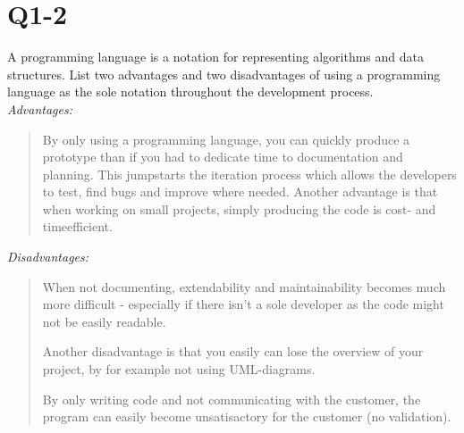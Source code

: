\section{Q1-2}
A programming language is a notation for representing algorithms and data structures. List two advantages and two disadvantages of using a programming language as the sole notation throughout the development process.\\

\emph{Advantages:}
\begin{quote}
By only using a programming language, you can quickly produce a prototype than if you had to dedicate time to documentation and planning. 
This jumpstarts the iteration process which allows the developers to test, find bugs and improve where needed.
Another advantage is that when working on small projects, simply producing the code is cost- and timeefficient.\\
\end{quote}

\emph{Disadvantages:}
\begin{quote}
When not documenting, extendability and maintainability becomes much more difficult - especially if there isn't a sole developer as the code might not be easily readable.

Another disadvantage is that you easily can lose the overview of your project, by for example not using UML-diagrams. 

By only writing code and not communicating with the customer, the program can easily become unsatisactory for the customer (no validation).
\end{quote}